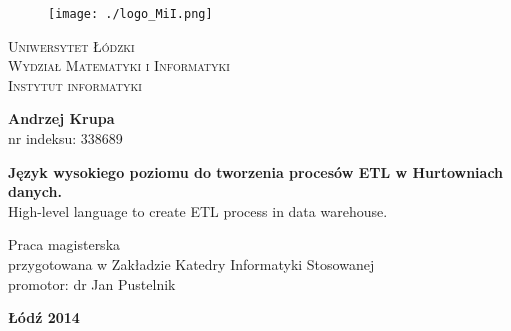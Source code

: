 
\begin{center}

\begin{center}

\begin{figure}[h!]
  \begin{center}
    \texttt{[image: ./logo\_MiI.png]}
  \end{center}
\end{figure}

\end{center}
\textsc{ \large Uniwersytet Łódzki\\
Wydział Matematyki i Informatyki \\
Instytut informatyki
}
\vskip 3cm
\end{center}
\begin{center}
{\Large \bf Andrzej Krupa }\\
 nr indeksu: 338689
\end{center}
\vskip 1cm
\begin{center}
{\Large \bf Język wysokiego poziomu do tworzenia procesów ETL w Hurtowniach danych.} \\
{ \large High-level language to create ETL process in data warehouse. }

\vskip 3cm
\begin{flushright}
Praca magisterska\\
przygotowana w Zakładzie Katedry Informatyki Stosowanej \\
promotor: dr Jan Pustelnik
\vskip 3cm

\end{flushright}
{\large \bf Łódź 2014}
\end{center}
\thispagestyle{empty}
\newpage\thispagestyle{empty}
\mbox{}
\newpage
